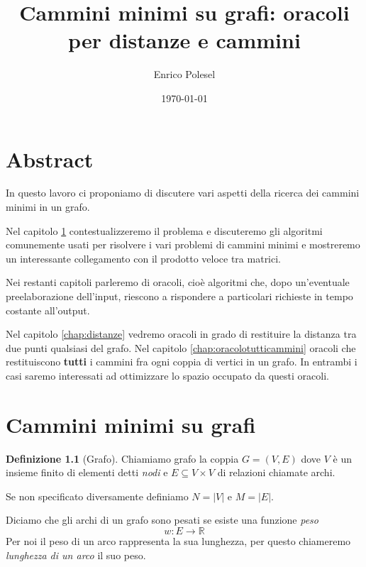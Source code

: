 \documentclass[a4paper,10pt]{amsbook}
\title{Cammini minimi su grafi: oracoli per distanze e cammini}
\author{Enrico Polesel}
\date{\today}
\newcounter{counter1}
\theoremstyle{plain}
\theoremstyle{definition}
\newtheorem{mydef}[counter1]{Definizione}
\theoremstyle{remark}
\newcommand{\abs}[1]{\left|#1\right|}
\begin{document}
\maketitle


\setcounter{tocdepth}{5}



\tableofcontents

\chapter*{Abstract}

In questo lavoro ci proponiamo di discutere vari aspetti della ricerca
dei cammini minimi in un grafo.

Nel capitolo \ref{chap:camminiminimi} contestualizzeremo il problema e
discuteremo gli algoritmi comunemente usati per risolvere i vari
problemi di cammini minimi e mostreremo un interessante collegamento
con il prodotto veloce tra matrici.

Nei restanti capitoli parleremo di oracoli, cioè algoritmi che,
dopo un'eventuale preelaborazione dell'input, riescono a rispondere a
particolari richieste in tempo costante all'output.

Nel capitolo \ref{chap:distanze} vedremo oracoli in grado di
restituire la distanza tra due punti qualsiasi del grafo. Nel capitolo
\ref{chap:oracolotutticammini} oracoli che restituiscono
\textbf{tutti} i cammini fra ogni coppia di vertici in un grafo. In
entrambi i casi saremo interessati ad ottimizzare lo spazio occupato
da questi oracoli.


\chapter{Cammini minimi su grafi}
\label{chap:camminiminimi}

\begin{mydef}[Grafo]
  Chiamiamo grafo la coppia $G = (V,E)$ dove $V$ è un insieme finito
  di elementi detti \textit{nodi} e $E\subseteq V \times V$ di
  relazioni chiamate archi.
\end{mydef}

Se non specificato diversamente definiamo $N = \abs{V}$ e $M =
\abs{E}$.

Diciamo che gli archi di un grafo sono pesati se esiste una funzione
\textit{peso}
\[ w : E \rightarrow \mathbb{R} \]
Per noi il peso di un arco rappresenta la sua lunghezza, per questo
chiameremo \textit{lunghezza di un arco} il suo peso.
\end{document}
